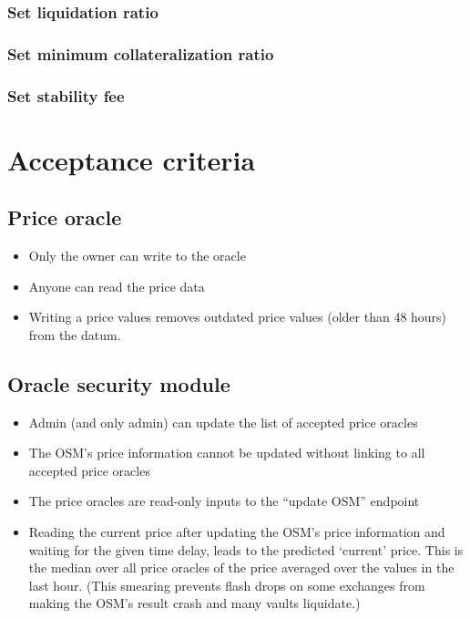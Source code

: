 \documentclass{article} %
\begin{document}
\subsubsection{Set liquidation ratio}

\subsubsection{Set minimum collateralization ratio}

\subsubsection{Set stability fee}

\section{Acceptance criteria}

\subsection{Price oracle}

\begin{itemize}
  \item Only the owner can write to the oracle
  \item Anyone can read the price data
  \item Writing a price values removes outdated price values (older than 48
    hours) from the datum.
\end{itemize}

\subsection{Oracle security module}

\begin{itemize}
  \item Admin (and only admin) can update the list of accepted price oracles
  \item The OSM's price information cannot be updated without linking to all
    accepted price oracles
  \item The price oracles are read-only inputs to the ``update OSM'' endpoint
  \item Reading the current price after updating the OSM's price information and
    waiting for the given time delay, leads to the predicted `current' price.
    This is the median over all price oracles of the price averaged over the
    values in the last hour. (This smearing prevents flash drops on some
    exchanges from making the OSM's result crash and many vaults liquidate.)
\end{itemize}
\end{document}
